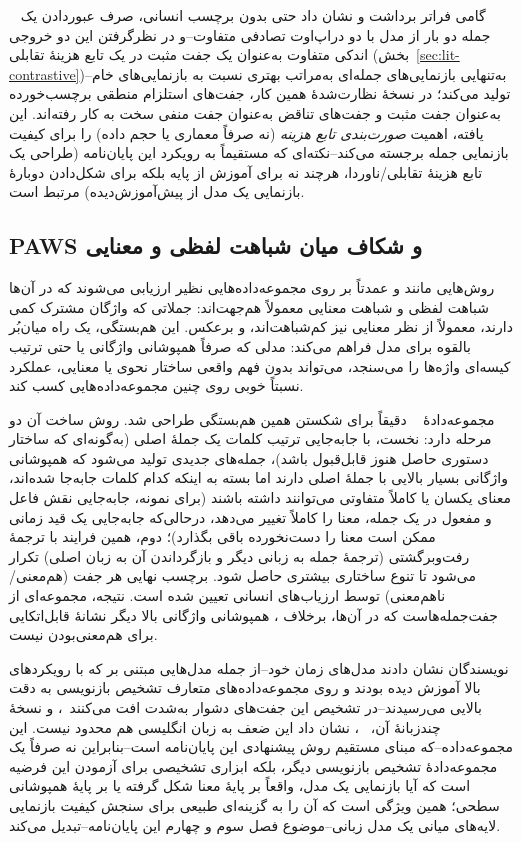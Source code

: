 ~\cite{gao2021simcse}
گامی فراتر برداشت و نشان داد حتی بدون برچسب انسانی، صرف عبوردادن یک جمله دو بار از مدل با دو دراپ‌اوت تصادفی متفاوت--و در نظرگرفتن این دو خروجی اندکی متفاوت به‌عنوان یک جفت مثبت در یک تابع هزینهٔ تقابلی (بخش~\ref{sec:lit-contrastive})--به‌تنهایی بازنمایی‌های جمله‌ای به‌مراتب بهتری نسبت به بازنمایی‌های خام
تولید می‌کند؛ در نسخهٔ نظارت‌شدهٔ همین کار، جفت‌های استلزام منطقی برچسب‌خورده به‌عنوان جفت مثبت و جفت‌های تناقض به‌عنوان جفت منفی سخت به کار رفته‌اند. این یافته، اهمیت \emph{صورت‌بندی تابع هزینه} (نه صرفاً معماری یا حجم داده) را برای کیفیت بازنمایی جمله برجسته می‌کند--نکته‌ای که مستقیماً به رویکرد این پایان‌نامه (طراحی یک تابع هزینهٔ تقابلی/ناوردا، هرچند نه برای آموزش از پایه بلکه برای شکل‌دادن دوبارهٔ بازنمایی یک مدل از پیش‌آموزش‌دیده) مرتبط است.

\subsection{PAWS و شکاف میان شباهت لفظی و معنایی}
روش‌هایی مانند
و
عمدتاً بر روی مجموعه‌داده‌هایی نظیر
ارزیابی می‌شوند که در آن‌ها شباهت لفظی و شباهت معنایی معمولاً هم‌جهت‌اند: جملاتی که واژگان مشترک کمی دارند، معمولاً از نظر معنایی نیز کم‌شباهت‌اند، و برعکس. این هم‌بستگی، یک راه میان‌بُر بالقوه برای مدل فراهم می‌کند: مدلی که صرفاً همپوشانی واژگانی یا حتی ترتیب کیسه‌ای
واژه‌ها را می‌سنجد، می‌تواند بدون فهم واقعی ساختار نحوی یا معنایی، عملکرد نسبتاً خوبی روی چنین مجموعه‌داده‌هایی کسب کند.

مجموعه‌دادهٔ
~\cite{zhang2019paws}
دقیقاً برای شکستن همین هم‌بستگی طراحی شد. روش ساخت آن دو مرحله دارد: نخست، با جابه‌جایی ترتیب کلمات یک جملهٔ اصلی (به‌گونه‌ای که ساختار دستوری حاصل هنوز قابل‌قبول باشد)، جمله‌های جدیدی تولید می‌شود که همپوشانی واژگانی بسیار بالایی با جملهٔ اصلی دارند اما بسته به اینکه کدام کلمات جابه‌جا شده‌اند، معنای یکسان یا کاملاً متفاوتی می‌توانند داشته باشند (برای نمونه، جابه‌جایی نقش فاعل و مفعول در یک جمله، معنا را کاملاً تغییر می‌دهد، درحالی‌که جابه‌جایی یک قید زمانی ممکن است معنا را دست‌نخورده باقی بگذارد)؛ دوم، همین فرایند با ترجمهٔ رفت‌وبرگشتی
(ترجمهٔ جمله به زبانی دیگر و بازگرداندن آن به زبان اصلی) تکرار می‌شود تا تنوع ساختاری بیشتری حاصل شود. برچسب نهایی هر جفت (هم‌معنی/ناهم‌معنی) توسط ارزیاب‌های انسانی تعیین شده است. نتیجه، مجموعه‌ای از جفت‌جمله‌هاست که در آن‌ها، برخلاف
، همپوشانی واژگانی بالا دیگر نشانهٔ قابل‌اتکایی برای هم‌معنی‌بودن نیست.

نویسندگان
نشان دادند مدل‌های زمان خود--از جمله مدل‌هایی مبتنی بر
که با رویکردهای بالا آموزش دیده بودند و روی مجموعه‌داده‌های متعارف تشخیص بازنویسی به دقت بالایی می‌رسیدند--در تشخیص این جفت‌های دشوار به‌شدت افت می‌کنند~\cite{zhang2019paws}، و نسخهٔ چندزبانهٔ آن،
~\cite{yang2019pawsx}، نشان داد این ضعف به زبان انگلیسی هم محدود نیست. این مجموعه‌داده--که مبنای مستقیم روش پیشنهادی این پایان‌نامه است--بنابراین نه صرفاً یک مجموعه‌دادهٔ تشخیص بازنویسی دیگر، بلکه ابزاری تشخیصی برای آزمودن این فرضیه است که آیا بازنمایی یک مدل، واقعاً بر پایهٔ معنا شکل گرفته یا بر پایهٔ همپوشانی سطحی؛ همین ویژگی است که آن را به گزینه‌ای طبیعی برای سنجش کیفیت بازنمایی لایه‌های میانی یک مدل زبانی--موضوع فصل سوم و چهارم این پایان‌نامه--تبدیل می‌کند.

